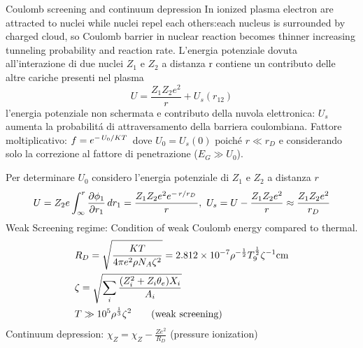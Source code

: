 \begin{frame}{Coulomb screening and continuum depression}
    In ionized plasma electron are attracted to nuclei while nuclei repel each others:each nucleus is surrounded by charged cloud, so Coulomb barrier in nuclear reaction becomes thinner increasing tunneling probability and reaction rate.
    L'energia potenziale dovuta all'interazione di due nuclei $Z_1$ e $Z_2$ a distanza r contiene un contributo delle altre cariche presenti nel plasma
    \begin{equation*}
    U=\frac{Z_1Z_2e^2}{r}+U_s(r_{12})
    \end{equation*}
    l'energia potenziale non schermata e contributo della nuvola elettronica: $U_s$ aumenta la probabilit\'a di attraversamento della barriera coulombiana.
    Fattore moltiplicativo: $f=e^{-\left.{U_0}\middle/{KT}\right.}$ dove $U_0=U_s(0)$ poich\'e $r\ll r_D$ e considerando solo la correzione al fattore di penetrazione ($E_G\gg U_0$).

Per determinare $U_0$ considero l'energia potenziale di $Z_1$ e $Z_2$ a distanza $r$
\begin{equation*}
U=Z_2e\int_{\infty}^r\PDy{r_1}{\phi_1}\,dr_1=\frac{Z_1Z_2e^2\exp{-\midfrac{r}{r_D}}}{r},\ U_s=U-\frac{Z_1Z_2e^2}{r}\approx\frac{Z_1Z_2e^2}{r_D}
\end{equation*}
Weak Screening regime: Condition of weak Coulomb energy compared to thermal.
\begin{align*}
    &R_D=\sqrt{\frac{KT}{4\pi e^2\rho N_A\zeta^2}}=\num{2.812e-7}\rho^{-\frac{1}{2}}T_9^{\frac{1}{2}}\invers{\zeta}\si{\cm}\\
    &\zeta=\sqrt{\sum_i \frac{(Z_i^2+Z_i\theta_e)X_i}{A_i}}\\
    &T\gg \num{e5}\rho^{\frac{1}{3}}\zeta^2\tag{weak screening}
\end{align*}
Continuum depression: $\chi_Z=\chi_Z-\frac{Ze^2}{R_D}$ (pressure ionization)
\end{frame}

